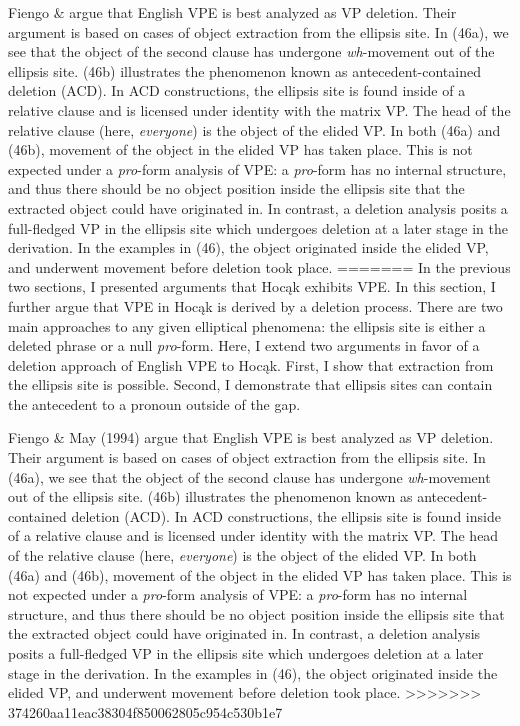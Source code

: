 \documentclass[output=paper]{LSP/langsci}
\begin{document}
Fiengo \& \citet{May1994} argue that English VPE is best analyzed as VP deletion. Their argument is based on cases of object extraction from the ellipsis site. In (46a), we see that the object of the second clause has undergone \emph{wh}-movement out of the ellipsis site. (46b) illustrates the phenomenon known as antecedent-contained deletion (ACD). In ACD constructions, the ellipsis site is found inside of a relative clause and is licensed under identity with the matrix VP. The head of the relative clause (here, \emph{everyone}) is the object of the elided VP. In both (46a) and (46b), movement of the object in the elided VP has taken place. This is not expected under a \emph{pro}-form analysis of VPE: a \emph{pro}-form has no internal structure, and thus there should be no object position inside the ellipsis site that the extracted object could have originated in. In contrast, a deletion analysis posits a full-fledged VP in the ellipsis site which undergoes deletion at a later stage in the derivation. In the examples in (46), the object originated inside the elided VP, and underwent movement before deletion took place.
=======
In the previous two sections, I presented arguments that Hoc\k{a}k exhibits VPE. In this section, I further argue that VPE in Hoc\k{a}k is derived by a deletion process. There are two main approaches to any given elliptical phenomena: the ellipsis site is either a deleted phrase or a null \emph{pro}-form. Here, I extend two arguments in favor of a deletion approach of English VPE to Hoc\k{a}k. First, I show that extraction from the ellipsis site is possible. Second, I demonstrate that ellipsis sites can contain the antecedent to a pronoun outside of the gap.

Fiengo \& May (1994) argue that English VPE is best analyzed as VP deletion. Their argument is based on cases of object extraction from the ellipsis site. In (46a), we see that the object of the second clause has undergone \emph{wh}-movement out of the ellipsis site. (46b) illustrates the phenomenon known as antecedent-contained deletion (ACD). In ACD constructions, the ellipsis site is found inside of a relative clause and is licensed under identity with the matrix VP. The head of the relative clause (here, \emph{everyone}) is the object of the elided VP. In both (46a) and (46b), movement of the object in the elided VP has taken place. This is not expected under a \emph{pro}-form analysis of VPE: a \emph{pro}-form has no internal structure, and thus there should be no object position inside the ellipsis site that the extracted object could have originated in. In contrast, a deletion analysis posits a full-fledged VP in the ellipsis site which undergoes deletion at a later stage in the derivation. In the examples in (46), the object originated inside the elided VP, and underwent movement before deletion took place.
>>>>>>> 374260aa11eac38304f850062805c954c530b1e7
\end{document}
